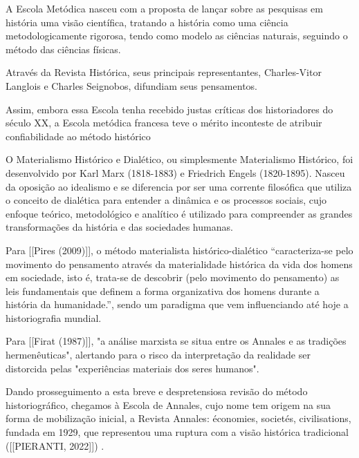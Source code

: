 A Escola Metódica nasceu com a proposta de  lançar sobre as pesquisas em história uma visão científica, tratando a história como uma ciência metodologicamente rigorosa, tendo como modelo as ciências naturais, seguindo o método das ciências físicas.

Através da Revista Histórica, seus principais representantes, Charles-Vitor Langlois e Charles Seignobos, difundiam seus pensamentos.


\noindent\begin{center}\mbox{\centering{}}\end{center}


Assim, embora essa Escola tenha recebido justas críticas dos historiadores do século XX, a Escola metódica francesa teve o mérito inconteste de atribuir confiabilidade ao método histórico

O Materialismo Histórico e Dialético, ou simplesmente Materialismo Histórico, foi desenvolvido  por Karl Marx (1818-1883) e Friedrich Engels (1820-1895). Nasceu da oposição ao idealismo e se diferencia por ser uma corrente filosófica que utiliza o conceito de dialética para entender a dinâmica e os processos sociais, cujo enfoque teórico, metodológico e analítico é utilizado para compreender as grandes transformações da história e das sociedades humanas.

Para  [[Pires (2009)]], o método materialista histórico-dialético “caracteriza-se pelo movimento do pensamento através da materialidade histórica da vida dos homens em sociedade, isto é, trata-se de descobrir (pelo movimento do pensamento) as leis fundamentais que definem a forma organizativa dos homens durante a história da humanidade.”, sendo um paradigma que vem influenciando até hoje a historiografia mundial.

Para [[Firat (1987)]], "a análise marxista se situa entre os Annales e as tradições hermenêuticas", alertando para o risco da interpretação da realidade ser distorcida pelas "experiências materiais dos seres humanos".

Dando prosseguimento a esta breve e despretensiosa revisão do método historiográfico, chegamos à Escola de Annales, cujo nome tem origem na sua forma de mobilização inicial, a Revista Annales: économies, societés, civilisations, fundada em 1929, que representou uma ruptura com a visão histórica tradicional ([[PIERANTI, 2022]]) .

